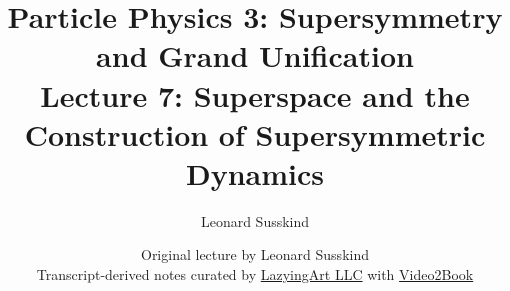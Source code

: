 \documentclass[11pt,oneside]{book}
\begin{document}
\frontmatter
\title{Particle Physics 3: Supersymmetry and Grand Unification\\[0.5em]
\large Lecture 7: Superspace and the Construction of Supersymmetric Dynamics}
\author{Leonard Susskind}
\date{Original lecture by Leonard Susskind\\[0.4em]
Transcript-derived notes curated by
\href{https://lazying.art}{LazyingArt LLC} with
\href{https://github.com/lachlanchen/Video2Book}{Video2Book}}
\maketitle
\mainmatter

\end{document}
